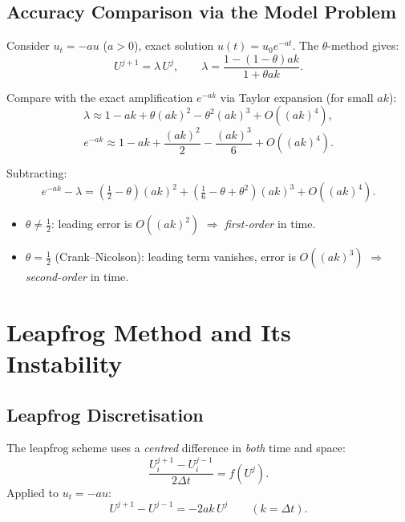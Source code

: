 \documentclass[12pt,a4paper]{article}
\theoremstyle{plain}
\theoremstyle{definition}
\theoremstyle{remark}
\newcommand{\dt}{\Delta t}
\newcommand{\OO}[1]{O\!\left(#1\right)}
\begin{document}
\subsection{Accuracy Comparison via the Model Problem}

Consider $u_{t}=-au$ ($a>0$), exact solution $u(t)=u_{0}e^{-at}$.
The $\theta$-method gives:
\[
  U^{j+1}=\lambda\,U^{j},\qquad
  \lambda=\frac{1-(1-\theta)ak}{1+\theta ak}.
\]

Compare with the exact amplification $e^{-ak}$ via Taylor expansion
(for small $ak$):
\[
  \lambda\approx
  1-ak+\theta(ak)^{2}-\theta^{2}(ak)^{3}+\OO{(ak)^{4}},
\]
\[
  e^{-ak}\approx
  1-ak+\frac{(ak)^{2}}{2}-\frac{(ak)^{3}}{6}+\OO{(ak)^{4}}.
\]

Subtracting:
\begin{equation}\label{eq:accuracy}
  e^{-ak}-\lambda
  =\left(\tfrac{1}{2}-\theta\right)(ak)^{2}
   +\left(\tfrac{1}{6}-\theta+\theta^{2}\right)(ak)^{3}
   +\OO{(ak)^{4}}.
\end{equation}

\begin{keybox}
\begin{itemize}
  \item $\theta\neq\tfrac{1}{2}$: leading error is $\OO{(ak)^{2}}$
        $\Rightarrow$ \emph{first-order} in time.
  \item $\theta=\tfrac{1}{2}$ (Crank--Nicolson): leading term vanishes,
        error is $\OO{(ak)^{3}}$ $\Rightarrow$ \emph{second-order} in time.
\end{itemize}
\end{keybox}

\section{Leapfrog Method and Its Instability}

\subsection{Leapfrog Discretisation}

The leapfrog scheme uses a \emph{centred} difference in \emph{both}
time and space:
\begin{equation}\label{eq:leapfrog}
  \frac{U_{i}^{j+1}-U_{i}^{j-1}}{2\dt}=f(U^{j}).
\end{equation}
Applied to $u_{t}=-au$:
\[
  U^{j+1}-U^{j-1}=-2ak\,U^{j}\qquad(k=\dt).
\]
\end{document}
